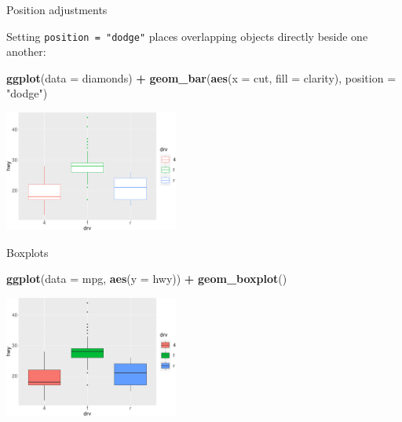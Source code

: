\documentclass[ignorenonframetext,]{beamer}
\newenvironment{Shaded}{\begin{snugshade}}{\end{snugshade}}
\newcommand{\DataTypeTok}[1]{\textcolor[rgb]{0.13,0.29,0.53}{#1}}
\newcommand{\KeywordTok}[1]{\textcolor[rgb]{0.13,0.29,0.53}{\textbf{#1}}}
\newcommand{\NormalTok}[1]{#1}
\newcommand{\OperatorTok}[1]{\textcolor[rgb]{0.81,0.36,0.00}{\textbf{#1}}}
\newcommand{\StringTok}[1]{\textcolor[rgb]{0.31,0.60,0.02}{#1}}
\begin{document}
\begin{frame}[fragile]{Position adjustments}
\protect\hypertarget{position-adjustments-3}{}

Setting \texttt{position\ =\ "dodge"} places overlapping objects
directly beside one another:

\begin{Shaded}
\begin{Highlighting}[]
\KeywordTok{ggplot}\NormalTok{(}\DataTypeTok{data =}\NormalTok{ diamonds) }\OperatorTok{+}\StringTok{ }
\StringTok{  }\KeywordTok{geom_bar}\NormalTok{(}\KeywordTok{aes}\NormalTok{(}\DataTypeTok{x =}\NormalTok{ cut, }\DataTypeTok{fill =}\NormalTok{ clarity), }
           \DataTypeTok{position =} \StringTok{"dodge"}\NormalTok{)}
\end{Highlighting}
\end{Shaded}

\begin{center}\includegraphics[height=150px]{data-visualization_files/figure-beamer/unnamed-chunk-138-1} \end{center}

\end{frame}

\begin{frame}[fragile]{Boxplots}
\protect\hypertarget{boxplots}{}

\begin{Shaded}
\begin{Highlighting}[]
\KeywordTok{ggplot}\NormalTok{(}\DataTypeTok{data =}\NormalTok{ mpg, }\KeywordTok{aes}\NormalTok{(}\DataTypeTok{y =}\NormalTok{ hwy)) }\OperatorTok{+}\StringTok{ }
\StringTok{  }\KeywordTok{geom_boxplot}\NormalTok{()}
\end{Highlighting}
\end{Shaded}

\begin{center}\includegraphics[height=150px]{data-visualization_files/figure-beamer/unnamed-chunk-139-1} \end{center}

\end{frame}
\end{document}
